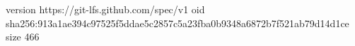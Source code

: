 version https://git-lfs.github.com/spec/v1
oid sha256:913a1ae394c97525f5ddae5c2857c5a23fba0b9348a6872b7f521ab79d14d1ce
size 466
